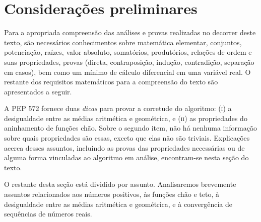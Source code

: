 \section*{Considerações preliminares}

Para a apropriada compreensão
das análises e provas realizadas no decorrer deste texto,
são necessários conhecimentos sobre matemática elementar, conjuntos,
potenciação, raízes, valor absoluto, somatórios, produtórios,
relações de ordem e suas propriedades,
provas (direta, contraposição, indução, contradição,
        separação em casos),
bem como um mínimo de cálculo diferencial em uma variável real.
O restante dos requisitos matemáticos para a compreensão do texto
são apresentados a seguir.

A PEP 572 fornece duas \emph{dicas}
para provar a corretude do algoritmo:
\textsc{(i)} a desigualdade entre as médias aritmética e geométrica,
e \textsc{(ii)} as propriedades do aninhamento de funções chão.
Sobre o segundo item,
não há nenhuma informação sobre quais propriedades são essas,
exceto que elas não são triviais.
Explicações acerca desses assuntos,
incluindo as provas das propriedades necessárias
ou de alguma forma vinculadas ao algoritmo em análise,
encontram-se nesta seção do texto.

O restante desta seção está dividido por assunto.
Analisaremos brevemente assuntos relacionados
aos números positivos,
às funções chão e teto,
à desigualdade entre as médias aritmética e geométrica,
e à convergência de sequências de números reais.

